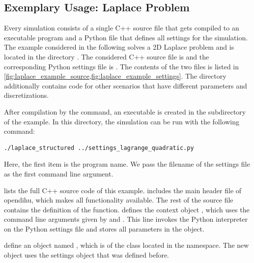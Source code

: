 \subsection{Exemplary Usage: Laplace Problem}\label{sec:exemplary_usage_1}
Every simulation consists of a single C++ source file that gets compiled to an executable program and a Python file that defines all settings for the simulation. The example considered in the following solves a 2D Laplace problem and is located in the directory . The considered C++ source file is  and the corresponding Python settings file is . The contents of the two files is listed in \cref{fig:laplace_example_source,fig:laplace_example_settings}. The directory additionally contains code for other scenarios that have different parameters and discretizations.

After compilation by the  command, an executable is created in the  subdirectory of the example. In this directory, the simulation can be run with the following command:
\begin{lstlisting}[columns=fullflexible,breaklines=true,postbreak=\mbox{\textcolor{gray}{$\hookrightarrow$}\space}]
  ./laplace_structured ../settings_lagrange_quadratic.py
\end{lstlisting}
Here, the first item is the program name. We pass the filename of the settings file as the first command line argument. 

 lists the full C++ source code of this example.  includes the main header file of opendihu, which makes all functionality available. The rest of the source file contains the definition of the  function.  defines the context object , which uses the command line arguments given by  and . This line invokes the Python interpreter on the Python settings file and stores all parameters in the  object.

 define an object named , which is of the  class located in the  namespace. The new object uses the settings object that was defined before.

